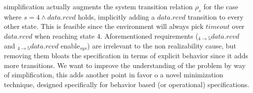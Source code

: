 simplification actually augments the system transition
relation $\rho_{s}$ for the case where
$s=4 \wedge data.rcvd$ holds, implicitly adding a
$data.rcvd$ transition to every other state.  This
is feasible since the environment will always pick
$timeout$ over $data.rcvd$ when reaching state $4$. 
Aforementioned requirements 
($_{4 \rightarrow 5} data.rcvd$ and $_{4 \rightarrow 5}
data.rcvd$ enable$_{sys}$) are irrelevant to the 
non realizability cause, but removing them 
bloats the specification in terms of explicit behavior
since it adds more transitions.  We want to
improve the understanding of the problem by way
of simplification, this adds another point in favor
o a novel minimization technique, designed specifically
for behavior based (or operational) specifications.